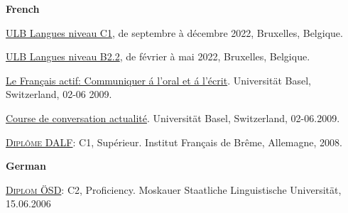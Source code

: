 \documentclass[10pt]{article}
\newenvironment{innerlist}[1][\enskip\textbullet]%
        {\begin{compactitem}[#1]}{\end{compactitem}}
\begin{document}
 \textbf{French} 
       \begin{innerlist} 
        \item \href{https://drive.google.com/file/d/1_qNfRvv6MGRX0uBsx8QIyt2JZqqCoQOr/view?usp=sharing}{ULB Langues niveau C1}, de septembre à décembre 2022, Bruxelles, Belgique.
       \item \href{https://drive.google.com/file/d/1GaQZlPGJaoAGX1qLmloGgavnDdkfJCi2/view?usp=sharing}{ULB Langues niveau B2.2}, de février à mai 2022, Bruxelles, Belgique.
       	\item  \href{https://drive.google.com/file/d/1v1BhUeUYSrhVEwaCxSzYZzW-yQCRGgNj/view?usp=share_link}{Le Fran\c cais actif: Communiquer \' a l'oral et \'a l'\'ecrit}. Universität Basel, Switzerland, 02-06 2009.
	\item \href{https://drive.google.com/file/d/1kC38WzQvS0twNOuwXhBj373HMluta1u-/view?usp=share_link}{Course de conversation actualit\'e}. Universität Basel, Switzerland, 02-06.2009. 
 	\item \href{https://drive.google.com/file/d/13q7YMKsqLFOB-uD0Ao7dYmGosQ_5XaKV/view?usp=share_link}{\textsc{Dipl\^ome DALF}}: C1, Sup\'erieur. Institut Fran\c cais de Br\^eme, Allemagne, 2008.	
	\end{innerlist}

\textbf{German}
\begin{innerlist} 
	\item \href{https://drive.google.com/file/d/1TeuAaleYz2kHNkhR0EzAa4o0Ty4GCZov/view?usp=share_link}{\textsc{Diplom \"OSD}}: C2, Proficiency. Moskauer Staatliche Linguistische Universit\"at, 15.06.2006
\end{innerlist} 
\end{document}
